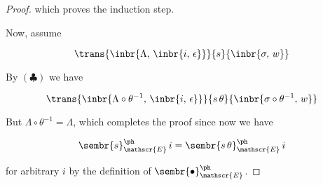 \begin{proof}
  which proves the induction step.

  Now, assume

  \[
  \trans{\inbr{\Lambda,\,\inbr{i,\,\epsilon}}}{s}{\inbr{\sigma,\,w}}
  \]

  By $(\clubsuit)$ we have

  \[
  \trans{\inbr{\Lambda\circ\theta^{-1},\,\inbr{i,\,\epsilon}}}{s\,\theta}{\inbr{\sigma\circ\theta^{-1},\,w}}
  \]

  But $\Lambda\circ\theta^{-1}=\Lambda$, which completes the proof since now we have

  \[
  \sembr{s}^\ph_\mathscr{E}\,i=\sembr{s\,\theta}^\ph_\mathscr{E}\,i
  \]

  for arbitrary $i$ by the definition of $\sembr{\bullet}^\ph_\mathscr{E}$.

\end{proof}

\begin{comment}
First, we define the set of all \emph{free variables} $\fv{}$ in expression or statement:

\[
\begin{array}{rclcl}
  \fv{x} &=& \{x\}&,& x\in\mathscr{X}\\
  \fv{z} &=&\emptyset &,&z\in\mathbb{N}\\
  \fv{l\oplus r} &=& \fv{l}\cup\fv{r}&&
\end{array}
\]

\[
\begin{array}{rcl}
  \fv{\llang{skip}}&=&\emptyset\\
  \fv{x\,\llang{:=}\,e}&=&\{x\}\cup\fv{e}\\
  \fv{\llang{read ($x$)}}&=&\{x\}\\
  \fv{\llang{write ($e$)}}&=&\fv{e}\\
  \fv{s_1\llang{;}s_2}&=&\fv{s_1}\cup\fv{s_2}xs
\end{array}
\]
\end{comment}
